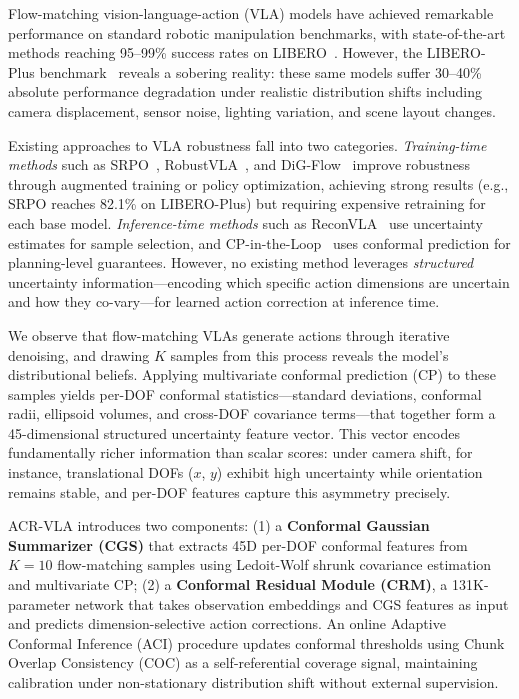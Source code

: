 \documentclass[letterpaper]{article}
\begin{document}
Flow-matching vision-language-action (VLA) models have achieved remarkable performance on standard robotic manipulation benchmarks, with state-of-the-art methods reaching 95--99\% success rates on LIBERO~\cite{liu2024libero}.
However, the LIBERO-Plus benchmark~\cite{liberoplus} reveals a sobering reality: these same models suffer 30--40\% absolute performance degradation under realistic distribution shifts including camera displacement, sensor noise, lighting variation, and scene layout changes.

Existing approaches to VLA robustness fall into two categories.
\emph{Training-time methods} such as SRPO~\cite{srpo}, RobustVLA~\cite{robustvla}, and DiG-Flow~\cite{digflow} improve robustness through augmented training or policy optimization, achieving strong results (e.g., SRPO reaches 82.1\% on LIBERO-Plus) but requiring expensive retraining for each base model.
\emph{Inference-time methods} such as ReconVLA~\cite{reconvla} use uncertainty estimates for sample selection, and CP-in-the-Loop~\cite{cploop} uses conformal prediction for planning-level guarantees.
However, no existing method leverages \emph{structured} uncertainty information---encoding which specific action dimensions are uncertain and how they co-vary---for learned action correction at inference time.

We observe that flow-matching VLAs generate actions through iterative denoising, and drawing $K$ samples from this process reveals the model's distributional beliefs.
Applying multivariate conformal prediction (CP) to these samples yields per-DOF conformal statistics---standard deviations, conformal radii, ellipsoid volumes, and cross-DOF covariance terms---that together form a 45-dimensional structured uncertainty feature vector.
This vector encodes fundamentally richer information than scalar scores: under camera shift, for instance, translational DOFs ($x$, $y$) exhibit high uncertainty while orientation remains stable, and per-DOF features capture this asymmetry precisely.

ACR-VLA introduces two components:
(1) a \textbf{Conformal Gaussian Summarizer (CGS)} that extracts 45D per-DOF conformal features from $K{=}10$ flow-matching samples using Ledoit-Wolf shrunk covariance estimation and multivariate CP;
(2) a \textbf{Conformal Residual Module (CRM)}, a 131K-parameter network that takes observation embeddings and CGS features as input and predicts dimension-selective action corrections.
An online Adaptive Conformal Inference (ACI) procedure updates conformal thresholds using Chunk Overlap Consistency (COC) as a self-referential coverage signal, maintaining calibration under non-stationary distribution shift without external supervision.
\end{document}

